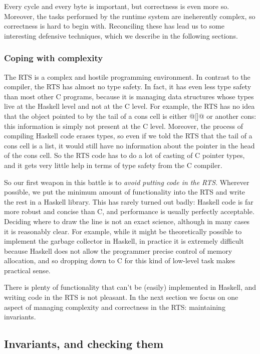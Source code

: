 \documentclass{article}
\begin{document}
{Every cycle and every byte is important, but correctness is even more
so.  Moreover, the tasks performed by the runtime system are
ineherently complex, so correctness is hard to begin with.
Reconciling these has lead us to some interesting defensive
techniques, which we describe in the following sections.

\subsubsection{Coping with complexity}
\label{s:rtsbugs}

The RTS is a complex and hostile programming environment.  In contrast
to the compiler, the RTS has almost no type safety.  In fact, it has
even less type safety than most other C programs, because it is
managing data structures whose types live at the Haskell level and not
at the C level.  For example, the RTS has no idea that the object
pointed to by the tail of a cons cell is either @[]@ or another cons:
this information is simply not present at the C level.  Moreover, the
process of compiling Haskell code erases types, so even if we told the
RTS that the tail of a cons cell is a list, it would still have no
information about the pointer in the head of the cons cell.  So the
RTS code has to do a lot of casting of C pointer types, and it gets
very little help in terms of type safety from the C compiler.

So our first weapon in this battle is to \emph{avoid putting code in
  the RTS}.  Wherever possible, we put the minimum amount of
functionality into the RTS and write the rest in a Haskell library.
This has rarely turned out badly: Haskell code is far more robust and
concise than C, and performance is usually perfectly acceptable.
Deciding where to draw the line is not an exact science, although in
many cases it is reasonably clear.  For example, while it might be
theoretically possible to implement the garbage collector in Haskell,
in practice it is extremely difficult because Haskell does not allow
the programmer precise control of memory allocation, and so dropping
down to C for this kind of low-level task makes practical sense.

There is plenty of functionality that can't be (easily) implemented in
Haskell, and writing code in the RTS is not pleasant.  In the next
section we focus on one aspect of managing complexity and correctness
in the RTS: maintaining invariants.

\subsection{Invariants, and checking them}

}
\end{document}
